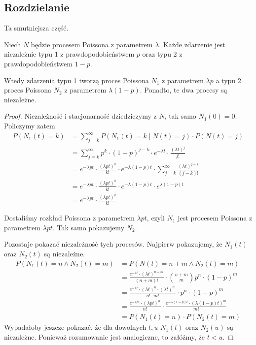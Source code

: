 \subsection{Rozdzielanie}
Ta smutniejsza część.
\begin{theorem}[Twierdzenie 8.13 P\&C]
	Niech \( N \) będzie procesem Poissona z parametrem \( \lambda \).
	Każde zdarzenie jest niezależnie typu 1 z prawdopodobieństwem \( p \) oraz typu 2 z prawdopodobieństwem \( 1 - p \).

	Wtedy zdarzenia typu 1 tworzą proces Poissona \( N_1 \) z parametrem \( \lambda p \) a typu 2 proces Poissona \( N_2 \) z parametrem \( \lambda (1-p) \). Ponadto, te dwa procesy są niezależne.
\end{theorem}
\begin{proof}
	Niezależność i stacjonarność dziedziczymy z \( N \), tak samo \( N_1(0) = 0 \).
	Policzymy zatem
	\begin{align*}
		P(N_1(t) = k)
		 & = \sum_{j=k}^\infty P(N_1(t) = k \mid N(t) = j) \cdot P(N(t) = j)                                             \\
		 & = \sum_{j=k}^\infty p^k \cdot (1-p)^{j-k} \cdot e^{-\lambda t} \cdot \frac{(\lambda t)^j}{j!}                 \\
		 & = e^{-\lambda p t} \cdot \frac{(\lambda p t)^k}{k!} \cdot e^{-\lambda (1 - p) t} \cdot
		\sum_{j=k}^\infty \frac{(\lambda t)^{j-k}}{(j-k)!}                                                               \\
		 & = e^{-\lambda p t} \cdot \frac{(\lambda p t)^k}{k!} \cdot e^{-\lambda (1 - p) t}  \cdot e^{\lambda (1 - p) t} \\
		 & = e^{-\lambda p t} \cdot \frac{(\lambda p t)^k}{k!}
	\end{align*}

	Dostaliśmy rozkład Poissona z parametrem \( \lambda p t \), czyli \( N_1 \) jest procesem Poissona z parametrem \( \lambda p t \). Tak samo pokazujemy \( N_2 \).

	Pozostaje pokazać niezależność tych procesów.
	Najpierw pokazujemy, że \( N_1(t) \) oraz \( N_2(t) \) są niezależne.
	\begin{align*}
		P(N_1(t) = n \land N_2(t) = m)
		 & = P(N(t) = n + m \land N_2(t) = m)                                                                                  \\
		 & = \frac{e^{-\lambda t}\cdot(\lambda t)^{n + m}}{(n + m)!} \cdot \binom{n + m}{m} p^n \cdot (1-p)^m                  \\
		 & = \frac{e^{-\lambda t}\cdot(\lambda t)^n \cdot (\lambda t)^m}{n! \cdot m!} \cdot p^n \cdot (1-p)^m                  \\
		 & = \frac{e^{-\lambda p t} \cdot (\lambda p t)^n}{n!} \cdot \frac{e^{-\lambda (1-p) t} \cdot (\lambda (1-p) t)^m}{m!} \\
		 & = P(N_1(t) = n) \cdot P(N_2(t) = m)
	\end{align*}
	Wypadałoby jeszcze pokazać, że dla dowolnych \(t, u\) \( N_1(t) \) oraz \( N_2(u) \) są niezależne.
	Ponieważ rozumowanie jest analogiczne, to załóżmy, że \( t < u \).


\end{proof}
